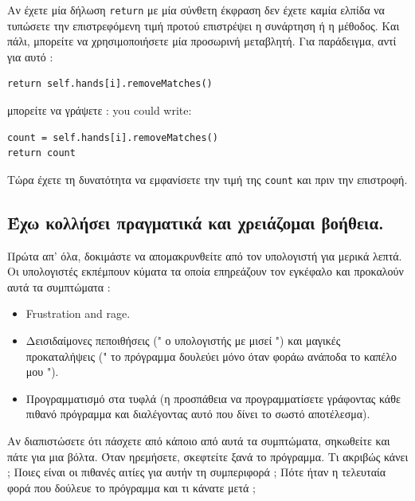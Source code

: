 \documentclass[10pt]{book}
\begin{document}
Αν έχετε μία δήλωση  {\tt return}  με μία σύνθετη έκφραση δεν έχετε καμία ελπίδα να τυπώσετε την επιστρεφόμενη τιμή προτού επιστρέψει η συνάρτηση ή η μέθοδος.  Και πάλι, μπορείτε να χρησιμοποιήσετε μία προσωρινή μεταβλητή.  Για παράδειγμα, αντί για αυτό :

\begin{verbatim}
return self.hands[i].removeMatches()
\end{verbatim}
%
 μπορείτε να γράψετε :
you could write:

\begin{verbatim}
count = self.hands[i].removeMatches()
return count
\end{verbatim}
%
 Τώρα έχετε τη δυνατότητα να εμφανίσετε την τιμή της  
{\tt count}  και πριν την επιστροφή.


\subsection{Έχω κολλήσει πραγματικά και χρειάζομαι βοήθεια.}

Πρώτα απ' όλα, δοκιμάστε να απομακρυνθείτε από τον υπολογιστή για μερικά λεπτά.  
Οι υπολογιστές εκπέμπουν κύματα τα οποία επηρεάζουν τον εγκέφαλο και προκαλούν 
αυτά τα συμπτώματα :

\begin{itemize}

 
\item Frustration and rage.

\item Δεισιδαίμονες πεποιθήσεις  (" ο υπολογιστής με μισεί ")  και 
μαγικές προκαταλήψεις  (" το πρόγραμμα δουλεύει μόνο όταν φοράω ανάποδα το καπέλο μου "). 

\item Προγραμματισμό στα τυφλά (η προσπάθεια να προγραμματίσετε γράφοντας κάθε πιθανό πρόγραμμα και διαλέγοντας αυτό που δίνει το σωστό αποτέλεσμα).
 

\end{itemize}

 Αν διαπιστώσετε ότι πάσχετε από κάποιο από αυτά τα συμπτώματα, σηκωθείτε και 
πάτε για μια βόλτα.  Όταν ηρεμήσετε, σκεφτείτε ξανά το πρόγραμμα. Τι ακριβώς κάνει ;   Ποιες είναι οι πιθανές αιτίες για αυτήν τη συμπεριφορά ;   
Πότε ήταν η τελευταία φορά που δούλευε το πρόγραμμα και τι κάνατε μετά ;
\end{document}
